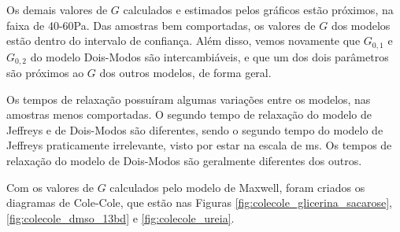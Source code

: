 		Os demais valores de \(G\) calculados e estimados pelos gráficos estão próximos, na faixa de 40-60Pa. Das amostras bem comportadas, os valores de \(G\) dos modelos estão dentro do intervalo de confiança. Além disso, vemos novamente que \(G_{0,1}\) e \(G_{0,2}\) do modelo Dois-Modos são intercambiáveis, e que um dos dois parâmetros são próximos ao \(G\) dos outros modelos, de forma geral.
		
		Os tempos de relaxação possuíram algumas variações entre os modelos, nas amostras menos comportadas. O segundo tempo de relaxação do modelo de Jeffreys e de Dois-Modos são diferentes, sendo o segundo tempo do modelo de Jeffreys praticamente irrelevante, visto por estar na escala de ms. Os tempos de relaxação do modelo de Dois-Modos são geralmente diferentes dos outros.
		
		Com os valores de \(G\) calculados pelo modelo de Maxwell, foram criados os diagramas de Cole-Cole, que estão nas Figuras \ref{fig:colecole_glicerina_sacarose}, \ref{fig:colecole_dmso_13bd} e \ref{fig:colecole_ureia}.
		


